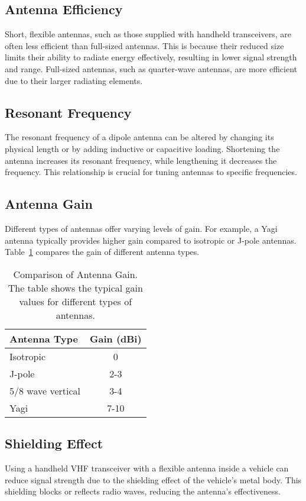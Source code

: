 \subsection*{Antenna Efficiency}
Short, flexible antennas, such as those supplied with handheld transceivers, are often less efficient than full-sized antennas. This is because their reduced size limits their ability to radiate energy effectively, resulting in lower signal strength and range. Full-sized antennas, such as quarter-wave antennas, are more efficient due to their larger radiating elements.

\subsection*{Resonant Frequency}
The resonant frequency of a dipole antenna can be altered by changing its physical length or by adding inductive or capacitive loading. Shortening the antenna increases its resonant frequency, while lengthening it decreases the frequency. This relationship is crucial for tuning antennas to specific frequencies.

\subsection*{Antenna Gain}
Different types of antennas offer varying levels of gain. For example, a Yagi antenna typically provides higher gain compared to isotropic or J-pole antennas. Table~\ref{tab:antenna_gain} compares the gain of different antenna types.

\begin{table}[h!]
    \centering
    \begin{tabular}{|l|c|}
        \hline
        \textbf{Antenna Type} & \textbf{Gain (dBi)} \\
        \hline
        Isotropic & 0 \\
        J-pole & 2-3 \\
        5/8 wave vertical & 3-4 \\
        Yagi & 7-10 \\
        \hline
    \end{tabular}
    \caption{Comparison of Antenna Gain. The table shows the typical gain values for different types of antennas.}
    \label{tab:antenna_gain}
\end{table}

\subsection*{Shielding Effect}
Using a handheld VHF transceiver with a flexible antenna inside a vehicle can reduce signal strength due to the shielding effect of the vehicle's metal body. This shielding blocks or reflects radio waves, reducing the antenna's effectiveness.

